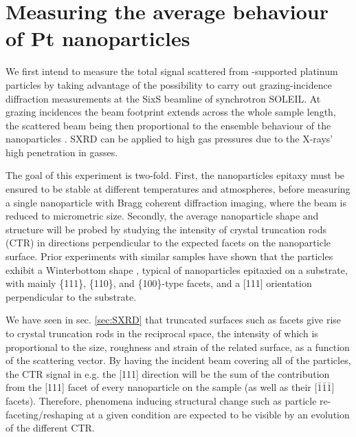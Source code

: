 \section{Measuring the average behaviour of Pt nanoparticles}


We first intend to measure the total signal scattered from -supported platinum particles by taking advantage of the possibility to carry out grazing-incidence diffraction measurements at the SixS beamline of synchrotron SOLEIL.
At grazing incidences the beam footprint extends across the whole sample length, the scattered beam being then proportional to the ensemble behaviour of the nanoparticles \parencite{Nolte2008, Hejral2013}.
SXRD can be applied to high gas pressures due to the X-rays’ high penetration in gasses.

The goal of this experiment is two-fold.
First, the nanoparticles epitaxy must be ensured to be stable at different temperatures and atmospheres, before measuring a single nanoparticle with Bragg coherent diffraction imaging, where the beam is reduced to micrometric size.
Secondly, the average nanoparticle shape and structure will be probed by studying the intensity of crystal truncation rods (CTR) in directions perpendicular to the expected facets on the nanoparticle surface.
Prior experiments with similar samples \parencite{Dupraz2017, Li2020, Lim2021, Dupraz2022} have shown that the particles exhibit a Winterbottom shape \parencite{WINTERBOTTOM1967, Boukouvala2021}, typical of nanoparticles epitaxied on a substrate, with mainly \{111\}, \{110\}, and \{100\}-type facets, and a [111] orientation perpendicular to the substrate.

We have seen in sec. \ref{sec:SXRD} that truncated surfaces such as facets give rise to crystal truncation rods in the reciprocal space, the intensity of which is proportional to the size, roughness and strain of the related surface, as a function of the scattering vector.
By having the incident beam covering all of the particles, the CTR signal in e.g. the [111] direction will be the sum of the contribution from the [111] facet of every nanoparticle on the sample (as well as their [$\bar{1}\bar{1}\bar{1}$] facets).
Therefore, phenomena inducing structural change such as particle re-faceting/reshaping at a given condition are expected to be visible by an evolution of the different CTR.

